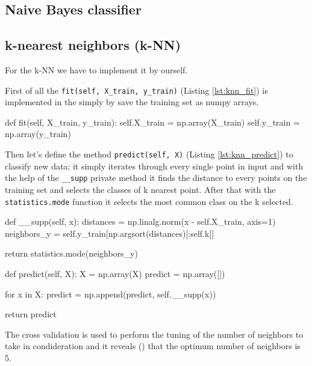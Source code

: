 \documentclass[12pt]{article}
\begin{document}
\subsection{Naive Bayes classifier}


\subsection{k-nearest neighbors (k-NN)}

For the k-NN we have to implement it by ourself. 

First of all the \verb|fit(self, X_train, y_train)| (Listing \ref{lst:knn_fit}) 
is implemented in the simply
by save the training set as numpy arrays.

\begin{python}[caption={k-NN fit method},label={lst:knn_fit}]
def fit(self, X_train, y_train):
    self.X_train = np.array(X_train)
    self.y_train = np.array(y_train)
\end{python}

Then let's define the method \verb|predict(self, X)| (Listing \ref{lst:knn_predict}) 
to classify new data; it simply iterates through every single point in input and 
with the help of the \verb|__supp| private method it finds the distance to every 
points on the training set and selects the classes of k nearest point. 
After that with the \verb|statistics.mode| function it selects the most common 
class on the k selected.

\begin{python}[caption={k-NN predict method},label={lst:knn_predict}]
def __supp(self, x):
    distances = np.linalg.norm(x - self.X_train, axis=1)
    neighbors_y = self.y_train[np.argsort(distances)[:self.k]]

    return statistics.mode(neighbors_y)


def predict(self, X):
    X = np.array(X)
    predict = np.array([])

    for x in X:
        predict = np.append(predict, self.__supp(x))

    return predict
\end{python}

The cross validation is used to perform the tuning of the number of neighbors to take
in condideration and it reveals () that the optimum number of neighbors is 5.
\end{document}
